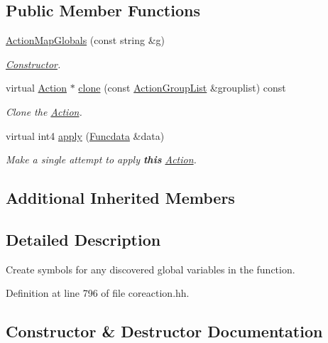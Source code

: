 \subsection*{Public Member Functions}
\begin{DoxyCompactItemize}
\item 
\mbox{\hyperlink{class_action_map_globals_abea8483d82fba9d828bd8a5d216dac80}{Action\+Map\+Globals}} (const string \&g)
\begin{DoxyCompactList}\small\item\em \mbox{\hyperlink{class_constructor}{Constructor}}. \end{DoxyCompactList}\item 
virtual \mbox{\hyperlink{class_action}{Action}} $\ast$ \mbox{\hyperlink{class_action_map_globals_ae5d0f824a0c3e33c588a7d90ed1ab3f5}{clone}} (const \mbox{\hyperlink{class_action_group_list}{Action\+Group\+List}} \&grouplist) const
\begin{DoxyCompactList}\small\item\em Clone the \mbox{\hyperlink{class_action}{Action}}. \end{DoxyCompactList}\item 
virtual int4 \mbox{\hyperlink{class_action_map_globals_a8d9376bd7f1d026c922f20f4b069e739}{apply}} (\mbox{\hyperlink{class_funcdata}{Funcdata}} \&data)
\begin{DoxyCompactList}\small\item\em Make a single attempt to apply {\bfseries{this}} \mbox{\hyperlink{class_action}{Action}}. \end{DoxyCompactList}\end{DoxyCompactItemize}
\subsection*{Additional Inherited Members}


\subsection{Detailed Description}
Create symbols for any discovered global variables in the function. 

Definition at line 796 of file coreaction.\+hh.



\subsection{Constructor \& Destructor Documentation}
\mbox{\label{class_action_map_globals_abea8483d82fba9d828bd8a5d216dac80}} 
